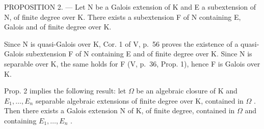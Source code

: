 PROPOSITION 2. --- Let N be a Galois extension of K and E a subextension of N, of finite degree over K. There exists a subextension F of N containing E, Galois and of finite degree over K.

Since N is quasi-Galois over K, Cor. 1 of V, p.~56 proves the existence of a quasi-Galois subextension F of N containing E and of finite degree over K. Since N is separable over K, the same holds for F (V, p.~36, Prop. 1), hence F is Galois over K.

Prop. 2 implies the following result: let \(\Omega\) be an algebraic closure of K and \(E_1, \ldots, E_n\) separable algebraic extensions of finite degree over K, contained in \(\Omega\) . Then there exists a Galois extension N of K, of finite degree, contained in \(\Omega\) and containing \(E_1, \ldots, E_n\) .

